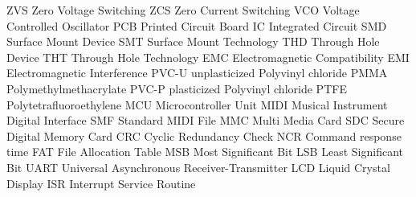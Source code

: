    {ZVS}    {Zero Voltage Switching}
   {ZCS}    {Zero Current Switching}
   {VCO}    {Voltage Controlled Oscillator}
   {PCB}    {Printed Circuit Board}
    {IC}     {Integrated Circuit}
   {SMD}    {Surface Mount Device}
   {SMT}    {Surface Mount Technology}
   {THD}    {Through Hole Device}
   {THT}    {Through Hole Technology}
   {EMC}    {Electromagnetic Compatibility}
   {EMI}    {Electromagnetic Interference}
  {PVC-U}  {unplasticized Polyvinyl chloride}
  {PMMA}   {Polymethylmethacrylate}
  {PVC-P}  {plasticized Polyvinyl chloride}
  {PTFE}   {Polytetrafluoroethylene}
   {MCU}    {Microcontroller Unit}
  {MIDI}   {Musical Instrument Digital Interface}
   {SMF}    {Standard MIDI File}
   {MMC}    {Multi Media Card}
   {SDC}    {Secure Digital Memory Card}
   {CRC}    {Cyclic Redundancy Check}
   {NCR}    {Command response time}
   {FAT}    {File Allocation Table}
   {MSB}    {Most Significant Bit}
   {LSB}    {Least Significant Bit}
  {UART}   {Universal Asynchronous Receiver-Transmitter}
   {LCD}    {Liquid Crystal Display}
   {ISR}    {Interrupt Service Routine}

